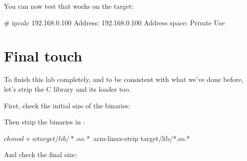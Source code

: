 You can now test that  works on the target:

\begin{bashinput}
# ipcalc 192.168.0.100
Address:	192.168.0.100
Address space:	Private Use
\end{bashinput}

\section{Final touch}

To finish this lab completely, and to be consistent with what we've done before,
let's strip the C library and its loader too.

First, check the initial size of the binaries:

Then strip the binaries in :
\begin{bashinput}
$ chmod +w target/lib/*.so.*
$ arm-linux-strip target/lib/*.so.*
\end{bashinput}

And check the final size:

